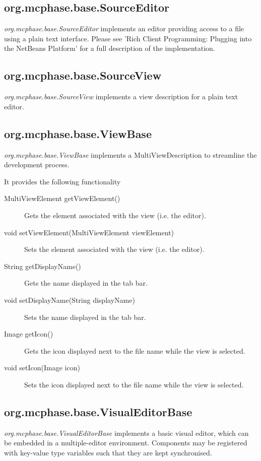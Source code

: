 \documentclass[11pt]{article}
\begin{document}
\subsection{org.mcphase.base.SourceEditor}
\emph{org.mcphase.base.SourceEditor} implements an editor providing access to a file using a plain text interface. Please see 'Rich Client Programming: Plugging into the NetBeans Platform' for a full description of the implementation.

\subsection{org.mcphase.base.SourceView}
\emph{org.mcphase.base.SourceView} implements a view description for a plain text editor.

\subsection{org.mcphase.base.ViewBase}
\emph{org.mcphase.base.ViewBase} implements a MultiViewDescription to streamline the development process.

It provides the following functionality
\begin{description}
\item[MultiViewElement getViewElement()]
Gets the element associated with the view (i.e. the editor).
\item[void setViewElement(MultiViewElement viewElement)]
Sets the element associated with the view (i.e. the editor).
\item[String getDisplayName()]
Gets the name displayed in the tab bar.
\item[void setDisplayName(String displayName)]
Sets the name displayed in the tab bar.
\item[Image getIcon()]
Gets the icon displayed next to the file name while the view is selected.
\item[void setIcon(Image icon)]
Sets the icon displayed next to the file name while the view is selected.
\end{description}

\subsection{org.mcphase.base.VisualEditorBase}
\emph{org.mcphase.base.VisualEditorBase} implements a basic visual editor, which can be embedded in a multiple-editor environment. Components may be registered with key-value type variables such that they are kept synchronised.
\end{document}
